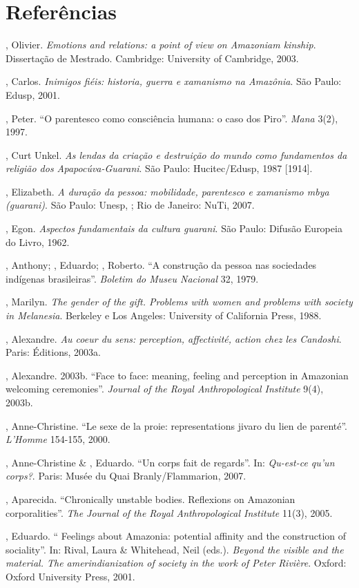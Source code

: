 \section{Referências}

\begin{Parskip}
, Olivier. \emph{Emotions and relations: a point of view on
Amazoniam kinship}. Dissertação de Mestrado. Cambridge: University of
Cambridge, 2003.

, Carlos. \emph{Inimigos fiéis: historia, guerra e xamanismo na
Amazônia}. São Paulo: Edusp, 2001.

, Peter. ``O parentesco como consciência humana: o caso dos Piro''.
\emph{Mana} 3(2), 1997.

, Curt Unkel. \emph{As lendas da criação e destruição do mundo
como fundamentos da religião dos Apapocúva-Guarani}. São Paulo:
Hucitec/Edusp, 1987 [1914].

, Elizabeth. \emph{A duração da pessoa: mobilidade, parentesco
e xamanismo mbya (guarani)}. São Paulo: Unesp, ; Rio de Janeiro:
NuTi, 2007.

, Egon. \emph{Aspectos fundamentais da cultura guarani}. São
Paulo: Difusão Europeia do Livro, 1962.

, Anthony; , Eduardo;  , Roberto. ``A
construção da pessoa nas sociedades indígenas brasileiras''. \emph{Boletim do
Museu Nacional} 32, 1979.

, Marilyn. \emph{The gender of the gift. Problems with women
and problems with society in Melanesia}. Berkeley e Los Angeles:
University of California Press, 1988.

, Alexandre. \emph{Au coeur du sens: perception, affectivité,
action chez les Candoshi}. Paris:  Éditions, 2003a.

, Alexandre. 2003b. ``Face to face: meaning, feeling and
perception in Amazonian welcoming ceremonies''. \emph{Journal of the Royal
Anthropological Institute} 9(4), 2003b.

, Anne-Christine. ``Le sexe de la proie: representations
jivaro du lien de parenté''. \emph{L’Homme} 154-155, 2000.

, Anne-Christine \&   , Eduardo. ``Un corps
fait de regards''. In: \emph{Qu-est-ce qu’un corps?}. Paris: Musée du Quai
Branly/Flammarion, 2007.

, Aparecida. ``Chronically unstable bodies. Reflexions on
Amazonian corporalities''. \emph{The Journal of the Royal Anthropological
Institute} 11(3), 2005.

  , Eduardo. `` Feelings about Amazonia:
potential affinity and the construction of sociality''. In: Rival, Laura
\& Whitehead, Neil (eds.). \emph{Beyond the visible and the material. The
amerindianization of society in the work of Peter Rivière}. Oxford:
Oxford University Press, 2001.
\end{Parskip}

